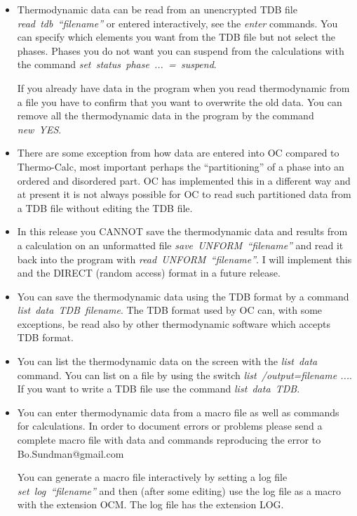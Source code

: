 \documentclass[12pt]{article}
\begin{document}
\begin{itemize}
\item Thermodynamic data can be read from an unencrypted TDB file {\em
  read~tdb~``filename''} or entered interactively, see the {\em enter}
  commands.  You can specify which elements you want from the TDB file
  but not select the phases.  Phases you do not want you can suspend
  from the calculations with the command {\em
    set~status~phase~...~=~suspend}.

  If you already have data in the program when you read thermodynamic
  from a file you have to confirm that you want to overwrite the old
  data.  You can remove all the thermodynamic data in the program by
  the command {\em new~YES}.

\item There are some exception from how data are entered into OC
  compared to Thermo-Calc, most important perhaps the ``partitioning''
  of a phase into an ordered and disordered part.  OC has implemented
  this in a different way and at present it is not always possible for
  OC to read such partitioned data from a TDB file without editing the
  TDB file.

\item In this release you CANNOT save the thermodynamic data and
  results from a calculation on an unformatted file {\em
    save~UNFORM~``filename''} and read it back into the program with
  {\em read~UNFORM~``filename''}.  I will implement this and the
  DIRECT (random access) format in a future release.

\item You can save the thermodynamic data using the TDB format by a
  command\\ {\em list~data~TDB~filename}.  The TDB format used by OC
  can, with some exceptions, be read also by other thermodynamic
  software which accepts TDB format.

\item You can list the thermodynamic data on the screen with the {\em
  list~data} command.  You can list on a file by using the switch {\em
  list~/output=filename ...}.  If you want to write a TDB file use the
  command {\em list~data~TDB}.

\item You can enter thermodynamic data from a macro file as well as
  commands for calculations.  In order to document errors or problems
  please send a complete macro file with data and commands reproducing
  the error to Bo.Sundman@gmail.com

  You can generate a macro file interactively by setting a log file
  {\em set~log~``filename''} and then (after some editing) use the log
  file as a macro with the extension OCM.  The log file has the
  extension LOG.
\end{itemize}
\end{document}

